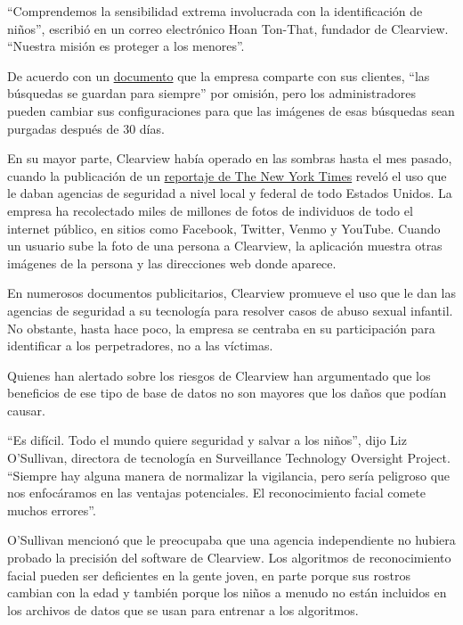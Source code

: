``Comprendemos la sensibilidad extrema involucrada con la identificación
de niños'', escribió en un correo electrónico Hoan Ton-That, fundador de
Clearview. ``Nuestra misión es proteger a los menores''.

De acuerdo con un
\href{https://int.nyt.com/data/documenthelper/6690-clearview-faq/c8b081a0bcca12e7903a/optimized/full.pdf\#page=1}{documento}
que la empresa comparte con sus clientes, ``las búsquedas se guardan
para siempre'' por omisión, pero los administradores pueden cambiar sus
configuraciones para que las imágenes de esas búsquedas sean purgadas
después de 30 días.

En su mayor parte, Clearview había operado en las sombras hasta el mes
pasado, cuando la publicación de un
\href{https://www.nytimes.com/es/2020/01/20/espanol/negocios/clearview-reconocimiento-facial.html}{reportaje
de The New York Times} reveló el uso que le daban agencias de seguridad
a nivel local y federal de todo Estados Unidos. La empresa ha
recolectado miles de millones de fotos de individuos de todo el internet
público, en sitios como Facebook, Twitter, Venmo y YouTube. Cuando un
usuario sube la foto de una persona a Clearview, la aplicación muestra
otras imágenes de la persona y las direcciones web donde aparece.

En numerosos documentos publicitarios, Clearview promueve el uso que le
dan las agencias de seguridad a su tecnología para resolver casos de
abuso sexual infantil. No obstante, hasta hace poco, la empresa se
centraba en su participación para identificar a los perpetradores, no a
las víctimas.

Quienes han alertado sobre los riesgos de Clearview han argumentado que
los beneficios de ese tipo de base de datos no son mayores que los daños
que podían causar.

``Es difícil. Todo el mundo quiere seguridad y salvar a los niños'',
dijo Liz O'Sullivan, directora de tecnología en Surveillance Technology
Oversight Project. ``Siempre hay alguna manera de normalizar la
vigilancia, pero sería peligroso que nos enfocáramos en las ventajas
potenciales. El reconocimiento facial comete muchos errores''.

O'Sullivan mencionó que le preocupaba que una agencia independiente no
hubiera probado la precisión del software de Clearview. Los algoritmos
de reconocimiento facial pueden ser deficientes en la gente joven, en
parte porque sus rostros cambian con la edad y también porque los niños
a menudo no están incluidos en los archivos de datos que se usan para
entrenar a los algoritmos.

